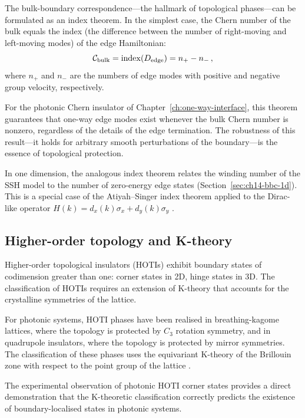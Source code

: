 The bulk-boundary correspondence---the hallmark of topological
phases---can be formulated as an index theorem.  In the simplest
case, the Chern number of the bulk equals the index (the difference
between the number of right-moving and left-moving modes) of the
edge Hamiltonian:
\begin{equation}\label{eq:appB-index-theorem}
  \mathcal{C}_{\mathrm{bulk}} = \mathrm{index}(D_{\mathrm{edge}})
  = n_+ - n_-\,,
\end{equation}
where $n_+$ and $n_-$ are the numbers of edge modes with positive
and negative group velocity, respectively.

For the photonic Chern insulator of
Chapter~\ref{ch:one-way-interface}, this theorem guarantees that
one-way edge modes exist whenever the bulk Chern number is nonzero,
regardless of the details of the edge termination.  The robustness
of this result---it holds for arbitrary smooth perturbations of the
boundary---is the essence of topological protection.

In one dimension, the analogous index theorem relates the winding
number of the SSH model to the number of zero-energy edge states
(Section~\ref{sec:ch14-bbc-1d}).  This is a special case of the
Atiyah--Singer index theorem applied to the Dirac-like operator
$H(k)=d_x(k)\sigma_x+d_y(k)\sigma_y$
\cite{asbth2016berry,atala2013direct}.

\subsection{Higher-order topology and K-theory}
\label{sec:appB-higher-order-k}

Higher-order topological insulators (HOTIs) exhibit boundary states
of codimension greater than one: corner states in 2D, hinge states
in 3D.  The classification of HOTIs requires an extension of K-theory
that accounts for the crystalline symmetries of the lattice.

For photonic systems, HOTI phases have been realised in
breathing-kagome lattices, where the topology is protected by
$C_3$ rotation symmetry, and in quadrupole insulators, where the
topology is protected by mirror symmetries.  The classification of
these phases uses the equivariant K-theory of the Brillouin zone with
respect to the point group of the lattice
\cite{kim2020recent,ozawa2018topological}.

The experimental observation of photonic HOTI corner states
\cite{li2022higher} provides a direct demonstration that the
K-theoretic classification correctly predicts the existence of
boundary-localised states in photonic systems.

